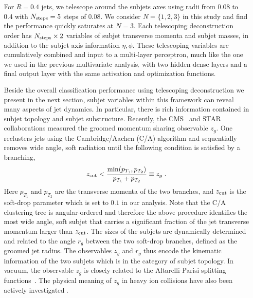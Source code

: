 \documentclass[notoc,preprintnumbers]{JHEP3}
\begin{document}
For $R=0.4$ jets, we telescope around the subjets axes using radii from 0.08 to 0.4 with $N_{\rm steps} = 5$ steps of 0.08. We consider $N=\{1,2,3\}$ in this study and find the performance quickly saturates at $N=3$. Each telescoping deconstruction order has $N_{\rm steps} \times 2$ variables of subjet transverse momenta and subjet masses, in addition to the subjet axis information $\eta, \phi$. %
These telescoping variables are cumulatively combined and input to a multi-layer perceptron, much like the one we used in the previous multivariate analysis, with two hidden dense layers and a final output layer with the same activation and optimization functions.

Beside the overall classification performance using telescoping deconstruction we present in the next section, subjet variables within this framework can reveal many aspects of jet dynamics. In particular, there is rich information contained in subjet topology and subjet substructure. Recently, the CMS~\cite{Sirunyan:2017bsd} and STAR~\cite{Kauder:2017mhg} collaborations measured the groomed momentum sharing observable $z_g$. One reclusters jets using the Cambridge/Aachen (C/A) algorithm \cite{Dokshitzer:1997in,Wobisch:1998wt} and sequentially removes wide angle, soft radiation until the following condition is satisfied by a branching,
\begin{equation}
    z_{\rm cut} < \frac{\min(p_{T_1},p_{T_2})}{p_{T_1}+p_{T_2}} \equiv z_g\;.
\label{SD}
\end{equation}
Here $p_{T_1}$ and $p_{T_2}$ are the transverse momenta of the two branches, and $z_{\rm cut}$ is the soft-drop parameter which is set to $0.1$ in our analysis. Note that the C/A clustering tree is angular-ordered and therefore the above procedure identifies the most wide angle, soft subjet that carries a significant fraction of the jet transverse momentum larger than $z_{\rm cut}$. The sizes of the subjets are dynamically determined and related to the angle $r_g$ between the two soft-drop branches, defined as the groomed jet radius. The observables $z_g$ and $r_g$ thus encode the kinematic information of the two subjets which is in the category of subjet topology. In vacuum, the observable $z_g$ is closely related to the Altarelli-Parisi splitting functions~\cite{Altarelli:1977zs}. The physical meaning of $z_g$ in heavy ion collisions have also been actively investigated \cite{Chien:2016led,Mehtar-Tani:2016aco,Milhano:2017nzm,Chang:2017gkt,Li:2017wwc}.
\end{document}
